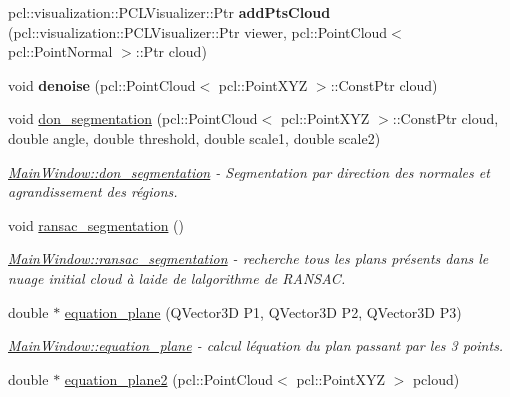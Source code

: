 \begin{DoxyCompactItemize}
\item 
\mbox{\label{classMainWindow_abc7b137a8520dd1ae264d40fae80320b}} 
pcl\+::visualization\+::\+P\+C\+L\+Visualizer\+::\+Ptr {\bfseries add\+Pts\+Cloud} (pcl\+::visualization\+::\+P\+C\+L\+Visualizer\+::\+Ptr viewer, pcl\+::\+Point\+Cloud$<$ pcl\+::\+Point\+Normal $>$\+::Ptr cloud)
\item 
\mbox{\label{classMainWindow_a6e4cbac16cfc95c2e4436a565eb9158a}} 
void {\bfseries denoise} (pcl\+::\+Point\+Cloud$<$ pcl\+::\+Point\+X\+YZ $>$\+::Const\+Ptr cloud)
\item 
void \hyperlink{classMainWindow_a643a46cc48a4cbab47ebb6e2e9d05ca0}{don\+\_\+segmentation} (pcl\+::\+Point\+Cloud$<$ pcl\+::\+Point\+X\+YZ $>$\+::Const\+Ptr cloud, double angle, double threshold, double scale1, double scale2)
\begin{DoxyCompactList}\small\item\em \hyperlink{classMainWindow_a643a46cc48a4cbab47ebb6e2e9d05ca0}{Main\+Window\+::don\+\_\+segmentation} -\/ Segmentation par direction des normales et agrandissement des régions. \end{DoxyCompactList}\item 
\mbox{\label{classMainWindow_ac6ecb3438b696b04a2bdd8547f81d30a}} 
void \hyperlink{classMainWindow_ac6ecb3438b696b04a2bdd8547f81d30a}{ransac\+\_\+segmentation} ()
\begin{DoxyCompactList}\small\item\em \hyperlink{classMainWindow_ac6ecb3438b696b04a2bdd8547f81d30a}{Main\+Window\+::ransac\+\_\+segmentation} -\/ recherche tous les plans présents dans le nuage initial cloud à l\textquotesingle{}aide de l\textquotesingle{}algorithme de R\+A\+N\+S\+AC. \end{DoxyCompactList}\item 
double $\ast$ \hyperlink{classMainWindow_a13b4ad1f6a3a4b6fa4f4bcb068b7d1e3}{equation\+\_\+plane} (Q\+Vector3D P1, Q\+Vector3D P2, Q\+Vector3D P3)
\begin{DoxyCompactList}\small\item\em \hyperlink{classMainWindow_a13b4ad1f6a3a4b6fa4f4bcb068b7d1e3}{Main\+Window\+::equation\+\_\+plane} -\/ calcul l\textquotesingle{}équation du plan passant par les 3 points. \end{DoxyCompactList}\item 
double $\ast$ \hyperlink{classMainWindow_a616d841913b70481fe6872e874dc090b}{equation\+\_\+plane2} (pcl\+::\+Point\+Cloud$<$ pcl\+::\+Point\+X\+YZ $>$ pcloud)

\end{DoxyCompactItemize}
